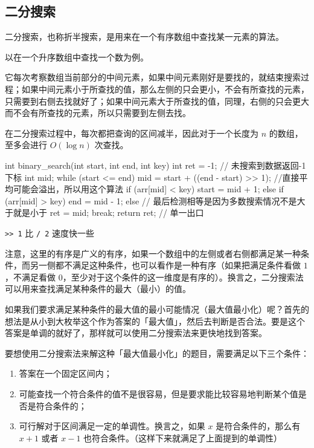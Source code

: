
\subsection{二分搜索}

二分搜索，也称折半搜索，是用来在一个有序数组中查找某一元素的算法。

以在一个升序数组中查找一个数为例。

它每次考察数组当前部分的中间元素，如果中间元素刚好是要找的，就结束搜索过程；如果中间元素小于所查找的值，那么左侧的只会更小，不会有所查找的元素，只需要到右侧去找就好了；如果中间元素大于所查找的值，同理，右侧的只会更大而不会有所查找的元素，所以只需要到左侧去找。

在二分搜索过程中，每次都把查询的区间减半，因此对于一个长度为 $n$ 的数组，至多会进行 $O(\log n)$ 次查找。

\begin{cppcode}
int binary_search(int start, int end, int key) {
  int ret = -1;  // 未搜索到数据返回-1下标
  int mid;
  while (start <= end) {
    mid = start + ((end - start) >> 1);  //直接平均可能会溢出，所以用这个算法
    if (arr[mid] < key)
      start = mid + 1;
    else if (arr[mid] > key)
      end = mid - 1;
    else {  // 最后检测相等是因为多数搜索情况不是大于就是小于
      ret = mid;
      break;
    }
  }
  return ret;  // 单一出口
}
\end{cppcode}

\begin{NOTE}{}{}
\texttt{>> 1} 比 \texttt{/ 2} 速度快一些

\end{NOTE}


注意，这里的有序是广义的有序，如果一个数组中的左侧或者右侧都满足某一种条件，而另一侧都不满足这种条件，也可以看作是一种有序（如果把满足条件看做 $1$，不满足看做 $0$，至少对于这个条件的这一维度是有序的）。换言之，二分搜索法可以用来查找满足某种条件的最大（最小）的值。

如果我们要求满足某种条件的最大值的最小可能情况（最大值最小化）呢？首先的想法是从小到大枚举这个作为答案的「最大值」，然后去判断是否合法。要是这个答案是单调的就好了，那样就可以使用二分搜索法来更快地找到答案。

要想使用二分搜索法来解这种「最大值最小化」的题目，需要满足以下三个条件：

\begin{enumerate}
\item 答案在一个固定区间内；
\item 可能查找一个符合条件的值不是很容易，但是要求能比较容易地判断某个值是否是符合条件的；
\item 可行解对于区间满足一定的单调性。换言之，如果 $x$ 是符合条件的，那么有 $x + 1$ 或者 $x - 1$ 也符合条件。（这样下来就满足了上面提到的单调性）
\end{enumerate}

